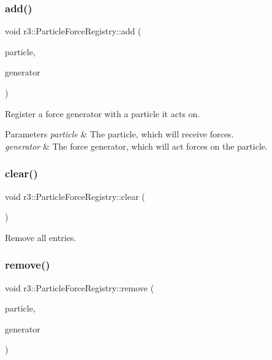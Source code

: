 \subsubsection{\texorpdfstring{add()}{add()}}
{\footnotesize\ttfamily void r3\+::\+Particle\+Force\+Registry\+::add (\begin{DoxyParamCaption}\item[{\mbox{\hyperlink{classr3_1_1_particle}{Particle}} $\ast$}]{particle,  }\item[{\mbox{\hyperlink{classr3_1_1_i_particle_force_generator}{I\+Particle\+Force\+Generator}} $\ast$}]{generator }\end{DoxyParamCaption})}



Register a force generator with a particle it acts on. 


\begin{DoxyParams}{Parameters}
{\em particle} & The particle, which will receive forces. \\
\hline
{\em generator} & The force generator, which will act forces on the particle. \\
\hline
\end{DoxyParams}
\mbox{\label{classr3_1_1_particle_force_registry_ac49c38fa041447278c56e68c6e796d77}} 
\subsubsection{\texorpdfstring{clear()}{clear()}}
{\footnotesize\ttfamily void r3\+::\+Particle\+Force\+Registry\+::clear (\begin{DoxyParamCaption}{ }\end{DoxyParamCaption})}



Remove all entries. 

\mbox{\label{classr3_1_1_particle_force_registry_adadb8aa711eea04ae1466a69b008aa83}} 
\subsubsection{\texorpdfstring{remove()}{remove()}}
{\footnotesize\ttfamily void r3\+::\+Particle\+Force\+Registry\+::remove (\begin{DoxyParamCaption}\item[{\mbox{\hyperlink{classr3_1_1_particle}{Particle}} $\ast$}]{particle,  }\item[{\mbox{\hyperlink{classr3_1_1_i_particle_force_generator}{I\+Particle\+Force\+Generator}} $\ast$}]{generator }\end{DoxyParamCaption})}



